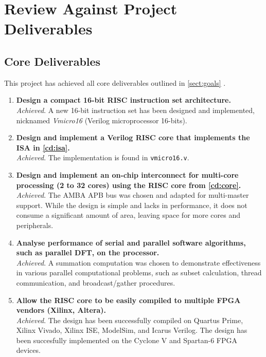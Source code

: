 \section{Review Against Project Deliverables}
\subsection{Core Deliverables}
This project has achieved all core deliverables outlined in \cref{sect:goals} .

\begin{enumerate}[leftmargin=2\parindent, label=\bfseries CD\arabic*]
\item{\textbf{Design a compact 16-bit RISC instruction set architecture.}\\
\textit{Achieved}. A new 16-bit instruction set has been designed and implemented, nicknamed \textit{Vmicro16} (Verilog microprocessor 16-bits).
}

\item{\textbf{Design and implement a Verilog RISC core that implements the ISA in \ref{cd:isa}.}\\
\textit{Achieved}. The implementation is found in \verb|vmicro16.v|.
}

\item{\textbf{Design and implement an on-chip interconnect for multi-core processing (2 to 32 cores) using the RISC core from \ref{cd:core}.}\\
\textit{Achieved}. The AMBA APB bus was chosen and adapted for multi-master support. While the design is simple and lacks in performance, it does not consume a significant amount of area, leaving space for more cores and peripherals.
}

\item{\textbf{Analyse performance of serial and parallel software algorithms, such as parallel DFT, on the processor.}\\
\textit{Achieved}. A summation computation was chosen to demonstrate effectiveness in various parallel computational problems, such as subset calculation, thread communication, and broadcast/gather procedures.
}

\item{\textbf{Allow the RISC core to be easily compiled to multiple FPGA vendors (Xilinx, Altera).}\\
\textit{Achieved}. The design has been successfully compiled on Quartus Prime, Xilinx Vivado, Xilinx ISE, ModelSim, and Icarus Verilog. The design has been succesfully implemented on the Cyclone V and Spartan-6 FPGA devices.
}
\end{enumerate}

